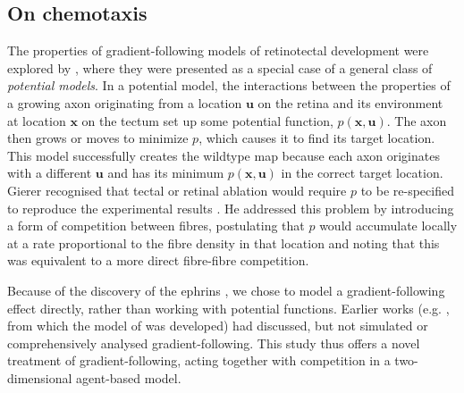 \documentclass[11pt, a4paper]{article}
\begin{document}

\subsection*{On chemotaxis}

The properties of gradient-following models of retinotectal development were explored by \citet{gierer_development_1981,gierer_model_1983,gierer_directional_1987}, where they were presented as a special case of a general class of \emph{potential models}.
In a potential model, the interactions between the properties of a growing axon originating from a location $\mathbf{u}$ on the retina and its environment at location $\mathbf{x}$ on the tectum set up some potential function, $p(\mathbf{x},\mathbf{u})$.
The axon then grows or moves to minimize $p$, which causes it to find its target location. This model successfully creates the wildtype map because each axon originates with a different $\mathbf{u}$ and has its minimum $p(\mathbf{x},\mathbf{u})$ in the correct target location.
Gierer recognised that tectal or retinal ablation would require $p$ to be re-specified to reproduce the experimental results \citep{attardi_preferential_1963,schmidt_retinal_1978,schmidt_expansion_1978}.
He addressed this problem by introducing a form of competition between fibres, postulating that $p$ would accumulate locally at a rate proportional to the fibre density in that location and noting that this was equivalent to a more direct fibre-fibre competition.

Because of the discovery of the ephrins \citep{cheng_complementary_1995,drescher_vitro_1995}, we chose to model a gradient-following effect directly, rather than working with potential functions.
Earlier works (e.g. \citet{hope_arrow_1976}, from which the model of \citet{simpson_simple_2011} was developed) had discussed, but not simulated or comprehensively analysed gradient-following.
This study thus offers a novel treatment of gradient-following, acting together with competition in a two-dimensional agent-based model.
\end{document}
